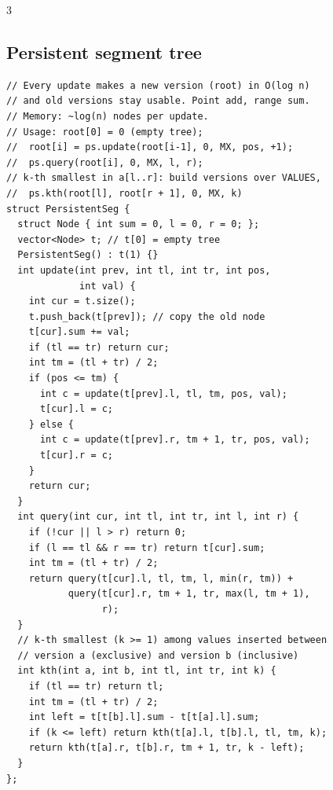 \documentclass[8pt, a4paper]{article}
\begin{document}
\begin{multicols*}{3}
\subsection{Persistent segment tree}
\begin{lstlisting}
// Every update makes a new version (root) in O(log n)
// and old versions stay usable. Point add, range sum.
// Memory: ~log(n) nodes per update.
// Usage: root[0] = 0 (empty tree);
//  root[i] = ps.update(root[i-1], 0, MX, pos, +1);
//  ps.query(root[i], 0, MX, l, r);
// k-th smallest in a[l..r]: build versions over VALUES,
//  ps.kth(root[l], root[r + 1], 0, MX, k)
struct PersistentSeg {
  struct Node { int sum = 0, l = 0, r = 0; };
  vector<Node> t; // t[0] = empty tree
  PersistentSeg() : t(1) {}
  int update(int prev, int tl, int tr, int pos,
             int val) {
    int cur = t.size();
    t.push_back(t[prev]); // copy the old node
    t[cur].sum += val;
    if (tl == tr) return cur;
    int tm = (tl + tr) / 2;
    if (pos <= tm) {
      int c = update(t[prev].l, tl, tm, pos, val);
      t[cur].l = c;
    } else {
      int c = update(t[prev].r, tm + 1, tr, pos, val);
      t[cur].r = c;
    }
    return cur;
  }
  int query(int cur, int tl, int tr, int l, int r) {
    if (!cur || l > r) return 0;
    if (l == tl && r == tr) return t[cur].sum;
    int tm = (tl + tr) / 2;
    return query(t[cur].l, tl, tm, l, min(r, tm)) +
           query(t[cur].r, tm + 1, tr, max(l, tm + 1),
                 r);
  }
  // k-th smallest (k >= 1) among values inserted between
  // version a (exclusive) and version b (inclusive)
  int kth(int a, int b, int tl, int tr, int k) {
    if (tl == tr) return tl;
    int tm = (tl + tr) / 2;
    int left = t[t[b].l].sum - t[t[a].l].sum;
    if (k <= left) return kth(t[a].l, t[b].l, tl, tm, k);
    return kth(t[a].r, t[b].r, tm + 1, tr, k - left);
  }
};
\end{lstlisting}

\end{multicols*}
\end{document}
